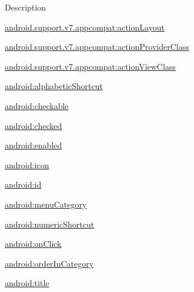 Description 

{\ttfamily \hyperlink{classandroid_1_1support_1_1v7_1_1appcompat_1_1R_1_1styleable_aa9ccfaac0ff76dfb80ddd32e3aaa8cdd}{android.\+support.\+v7.\+appcompat\+:action\+Layout}}

{\ttfamily \hyperlink{classandroid_1_1support_1_1v7_1_1appcompat_1_1R_1_1styleable_ac073414cb46c8a3e83defa8389f0edf3}{android.\+support.\+v7.\+appcompat\+:action\+Provider\+Class}}

{\ttfamily \hyperlink{classandroid_1_1support_1_1v7_1_1appcompat_1_1R_1_1styleable_aa4c4c88d63a6e2feeb8ed1bf4b4ee9ed}{android.\+support.\+v7.\+appcompat\+:action\+View\+Class}}

{\ttfamily \hyperlink{classandroid_1_1support_1_1v7_1_1appcompat_1_1R_1_1styleable_a38db6569328350109b52ba3309f4acea}{android\+:alphabetic\+Shortcut}}

{\ttfamily \hyperlink{classandroid_1_1support_1_1v7_1_1appcompat_1_1R_1_1styleable_a1433c4a05cbb355a72bedbab97afd46d}{android\+:checkable}}

{\ttfamily \hyperlink{classandroid_1_1support_1_1v7_1_1appcompat_1_1R_1_1styleable_a66e284a7841a55ccafec733792f58b10}{android\+:checked}}

{\ttfamily \hyperlink{classandroid_1_1support_1_1v7_1_1appcompat_1_1R_1_1styleable_a103c4fa89f60f64ac3088a849b02a58e}{android\+:enabled}}

{\ttfamily \hyperlink{classandroid_1_1support_1_1v7_1_1appcompat_1_1R_1_1styleable_a78b2cf536eb665f433feaa539b904381}{android\+:icon}}

{\ttfamily \hyperlink{classandroid_1_1support_1_1v7_1_1appcompat_1_1R_1_1styleable_a4ba49d8b037ce6465e4c632c336e8363}{android\+:id}}

{\ttfamily \hyperlink{classandroid_1_1support_1_1v7_1_1appcompat_1_1R_1_1styleable_a9c6e0b2ed82827b95fcff2fbf9f39051}{android\+:menu\+Category}}

{\ttfamily \hyperlink{classandroid_1_1support_1_1v7_1_1appcompat_1_1R_1_1styleable_aee6f9bc59bc0547644270a50ba642e63}{android\+:numeric\+Shortcut}}

{\ttfamily \hyperlink{classandroid_1_1support_1_1v7_1_1appcompat_1_1R_1_1styleable_aa6d58c4b1c1b588c49af10c836c5766d}{android\+:on\+Click}}

{\ttfamily \hyperlink{classandroid_1_1support_1_1v7_1_1appcompat_1_1R_1_1styleable_a330d0bddcfe98ca0abe1e746c3d7a33e}{android\+:order\+In\+Category}}

{\ttfamily \hyperlink{classandroid_1_1support_1_1v7_1_1appcompat_1_1R_1_1styleable_adf2e7aa6bcadb8c5cf1968595d673c5d}{android\+:title}}

